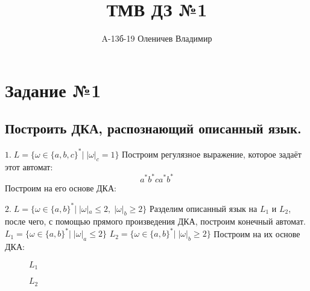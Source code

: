 \documentclass[a4paper,12pt]{article}
\title{ТМВ ДЗ №1}
\author{A-13б-19 Оленичев Владимир}
\date{}
\begin{document}
\maketitle

\section*{\Huge Задание №1}

\subsection*{Построить ДКА, распознающий описанный язык.}

\Large $1.\;L = {\{\omega \in \{a,b,c\}^*|\;|\omega|_c = 1\}}$\newline
Построим регулязное выражение, которое задаёт этот автомат:\newline
\Large$$a^*b^*ca^*b^*$$\newline
Построим на его основе ДКА:\newline
\begin{figure}[h]
\centering
{}
\end{figure}

\Large $2.\;L = {\{\omega \in \{a,b\}^*|\;|\omega|_a \le 2,\;|\omega|_b \ge 2\}}$\newline
Разделим описанный язык на $L_1$ и $L_2$, после чего, с помощью прямого произведения ДКА, построим конечный автомат.\newline
\Large $L_1 = {\{\omega \in \{a,b\}^*|\;|\omega|_a \le 2\}}$\newline
\Large $L_2 = {\{\omega \in \{a,b\}^*|\;|\omega|_b \ge 2\}}$\newline
Построим на их основе ДКА:\newline
\begin{figure}[h]
\centering
{}
\caption{$L_1$}
\end{figure}

\begin{figure}[h]
\centering
{}
\caption{$L_2$}
\end{figure}
\end{document}
